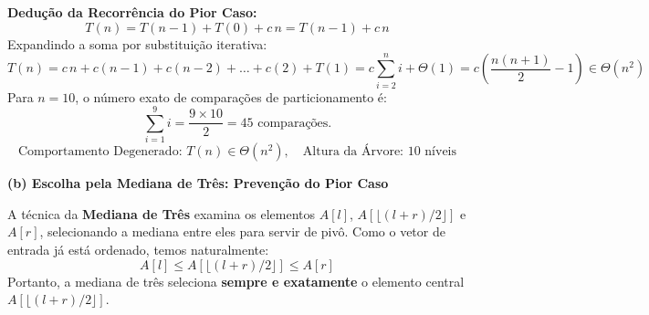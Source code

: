 \documentclass[11pt,a4paper]{article}
\newcommand{\res}[1]{\[\boxed{#1}\]}
\newcommand{\topico}[1]{\par\medskip\textbf{\color{azul}#1}\par}
\begin{document}
\begin{center}
\end{center}

\textbf{Dedução da Recorrência do Pior Caso:}
\[
T(n) = T(n-1) + T(0) + c\,n = T(n-1) + c\,n
\]
Expandindo a soma por substituição iterativa:
\[
T(n) = c\,n + c(n-1) + c(n-2) + \dots + c(2) + T(1) = c \sum_{i=2}^{n} i + \Theta(1) = c\left(\frac{n(n+1)}{2} - 1\right) \in \Theta(n^2)
\]
Para $n=10$, o número exato de comparações de particionamento é:
\[
\sum_{i=1}^{9} i = \frac{9 \times 10}{2} = 45 \text{ comparações.}
\]
\res{\text{Comportamento Degenerado: } T(n) \in \Theta(n^2), \quad \text{Altura da Árvore: } 10 \text{ níveis}}

\newpage
\topico{(b) Escolha pela Mediana de Três: Prevenção do Pior Caso}
A técnica da \textbf{Mediana de Três} examina os elementos $A[l]$, $A[\lfloor (l+r)/2 \rfloor]$ e $A[r]$, selecionando a mediana entre eles para servir de pivô.
Como o vetor de entrada já está ordenado, temos naturalmente:
\[
A[l] \le A[\lfloor (l+r)/2 \rfloor] \le A[r]
\]
Portanto, a mediana de três seleciona \textbf{sempre e exatamente} o elemento central $A[\lfloor (l+r)/2 \rfloor]$.
\end{document}
